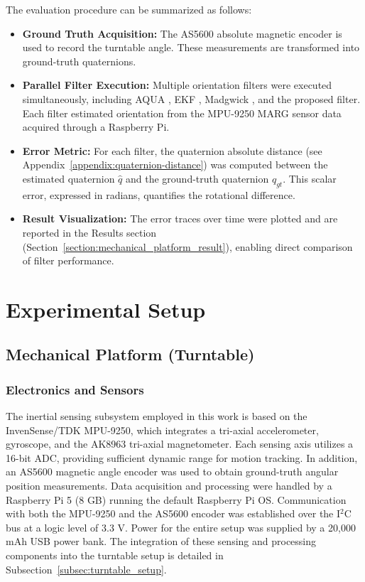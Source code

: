 \documentclass{iutbscthesis}
\begin{document}
The evaluation procedure can be summarized as follows:
\begin{itemize}
    \item \textbf{Ground Truth Acquisition:} The AS5600 absolute magnetic encoder is used to record the turntable angle. These measurements are transformed into ground-truth quaternions. 
    \item \textbf{Parallel Filter Execution:} Multiple orientation filters were executed simultaneously, including AQUA \cite{valenti2015keeping}, EKF \cite{ekf_ref}, Madgwick \cite{madgwick2011estimation}, and the proposed filter. Each filter estimated orientation from the MPU-9250 MARG sensor data acquired through a Raspberry Pi. 
    \item \textbf{Error Metric:} For each filter, the quaternion absolute distance (see Appendix~\ref{appendix:quaternion-distance}) was computed between the estimated quaternion $\hat{q}$ and the ground-truth quaternion $q_{gt}$. This scalar error, expressed in radians, quantifies the rotational difference. 
    \item \textbf{Result Visualization:} The error traces over time were plotted and are reported in the Results section (Section~\ref{section:mechanical_platform_result}), enabling direct comparison of filter performance. 
\end{itemize}


\chapter{Experimental Setup}\label{chapter:setup}


\section{Mechanical Platform (Turntable)}\label{section:turntable}

\subsection{Electronics and Sensors}\label{subsec:sensors}
The inertial sensing subsystem employed in this work is based on the InvenSense/TDK MPU-9250, which integrates a tri-axial accelerometer, gyroscope, and the AK8963 tri-axial magnetometer. Each sensing axis utilizes a 16-bit ADC, providing sufficient dynamic range for motion tracking. In addition, an AS5600 magnetic angle encoder was used to obtain ground-truth angular position measurements. Data acquisition and processing were handled by a Raspberry Pi 5 (8 GB) running the default Raspberry Pi OS. Communication with both the MPU-9250 and the AS5600 encoder was established over the I$^2$C bus at a logic level of 3.3 V. Power for the entire setup was supplied by a 20,000 mAh USB power bank. The integration of these sensing and processing components into the turntable setup is detailed in Subsection~\ref{subsec:turntable_setup}.
\end{document}
